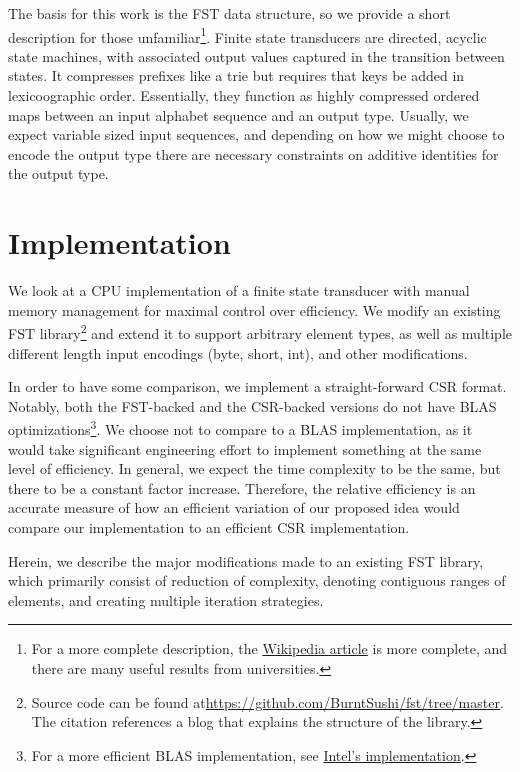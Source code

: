 \documentclass[12pt]{article}
\begin{document}
The basis for this work is the FST data structure, so we provide a short description for those
unfamiliar\footnote{For a more complete description, the
\href{https://en.wikipedia.org/wiki/Finite-state_transducer}{Wikipedia article} is more
complete, and there are many useful results from universities.}. Finite state transducers are
directed, acyclic state machines, with associated output values captured in the transition
between states. It compresses prefixes like a trie but requires that keys be added in
lexicoographic order. Essentially, they function as highly compressed ordered
maps between an input alphabet sequence and an output type. Usually, we expect variable sized
input sequences, and depending on how we might choose to encode the output type there are
necessary constraints on additive identities for the output type.

\section{Implementation}

We look at a CPU implementation of a finite state transducer with manual memory management for
maximal control over efficiency. We modify an existing FST
library\cite{FSTBlog}\footnote{Source code can be found
at\url{https://github.com/BurntSushi/fst/tree/master}. The citation references a blog that
explains the structure of the library.} and extend it to support arbitrary element types, as well
as multiple different length input encodings (byte, short, int), and other modifications.

In order to have some comparison, we implement a straight-forward CSR format. Notably, both the
FST-backed and the CSR-backed versions do not have
BLAS optimizations\footnote{For a more efficient BLAS implementation, see
\href{https://software.intel.com/en-us/mkl-developer-reference-c-sparse-blas-csr-matrix-storage-format}
{Intel's implementation}.}. We choose not to compare to a BLAS implementation, as it would take
significant engineering effort to implement something at the same level of efficiency. In general,
we expect the time complexity to be the same, but there to be a constant factor increase.
Therefore, the relative efficiency is an accurate measure of how an efficient variation of our
proposed idea would compare our implementation to an efficient CSR implementation.

Herein, we describe the major modifications made to an existing FST library, which primarily consist of
reduction of complexity, denoting contiguous ranges of elements, and creating multiple iteration
strategies.
\end{document}
